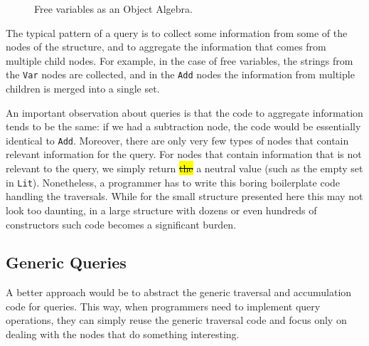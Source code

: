 \begin{figure}[t]
\nocaptionrule
\caption{Free variables as an Object Algebra.}
\label{freevars_without_monoid}
\end{figure}
\begin{comment}
\bruno{put code in a figure, add a caption and refer
  to the figure in the text.}
\end{comment}

The typical pattern of a query is to collect some information from
some of the nodes of the structure, and to aggregate the information
that comes from multiple child nodes. For example, in the case of free
variables, the strings from the \lstinline{Var} nodes are collected,
and in the \lstinline{Add} nodes the information from multiple
children is merged into a single set.

An important observation about
queries is that the code to aggregate information tends to be the
same: if we had a subtraction node, the code would be essentially
identical to \lstinline{Add}. Moreover, there are only very few types
of nodes that contain relevant information for the query. For nodes
that contain information that is not relevant to the query, we simply
return \hl{\sout{the}} a neutral value (such as the empty set in \lstinline{Lit}).
Nonetheless, a programmer has to write this boring boilerplate code
handling the traversals.  While for the small structure presented here
this may not look too daunting, in a large structure with dozens or
even hundreds of constructors such code becomes a significant burden.


\subsection{Generic Queries}\label{subsec:genericquery}

A better approach would be to abstract the generic traversal
and accumulation code for queries. This way, when programmers need to implement query
operations, they can simply reuse the generic traversal code and
focus only on dealing with the nodes that do something interesting.


